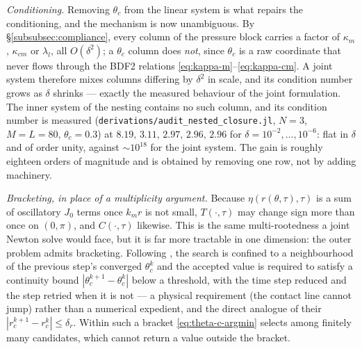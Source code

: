 \emph{Conditioning.} Removing $\theta_c$ from the linear system is what repairs the conditioning, and the mechanism is now unambiguous. By \S\ref{subsubsec:compliance}, every column of the pressure block carries a factor of $\kappa_m$, $\kappa_{cm}$ or $\lambda_l$, all $O(\delta^2)$; a $\theta_c$ column does \emph{not}, since $\theta_c$ is a raw coordinate that never flows through the BDF2 relations \eqref{eq:kappa-m}--\eqref{eq:kappa-cm}. A joint system therefore mixes columns differing by $\delta^2$ in scale, and its condition number grows as $\delta$ shrinks --- exactly the measured behaviour of the joint formulation. The inner system of the nesting contains no such column, and its condition number is measured (\texttt{derivations/audit\_nested\_closure.jl}, $N=3$, $M=L=80$, $\theta_c=0.3$) at $8.19,\,3.11,\,2.97,\,2.96,\,2.96$ for $\delta=10^{-2},\dots,10^{-6}$: flat in $\delta$ and of order unity, against $\sim10^{18}$ for the joint system. The gain is roughly eighteen orders of magnitude and is obtained by removing one row, not by adding machinery.

\emph{Bracketing, in place of a multiplicity argument.} Because $\eta(r(\theta,\tau),\tau)$ is a sum of oscillatory $J_0$ terms once $k_mr$ is not small, $T(\cdot,\tau)$ may change sign more than once on $(0,\pi)$, and $C(\cdot,\tau)$ likewise. This is the same multi-rootedness a joint Newton solve would face, but it is far more tractable in one dimension: the outer problem admits bracketing. Following \cite{AgueroEtAl2026}, the search is confined to a neighbourhood of the previous step's converged $\theta_c^k$ and the accepted value is required to satisfy a continuity bound $|\theta_c^{k+1}-\theta_c^k|$ below a threshold, with the time step reduced and the step retried when it is not --- a physical requirement (the contact line cannot jump) rather than a numerical expedient, and the direct analogue of their $|r_c^{k+1}-r_c^k|\le\delta_r$. Within such a bracket \eqref{eq:theta-c-argmin} selects among finitely many candidates, which cannot return a value outside the bracket.

